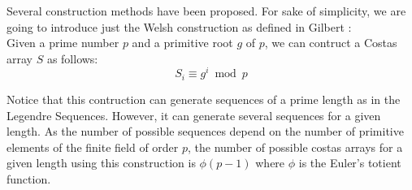 Several construction methods have
been proposed. For sake of simplicity, we are going to introduce just the Welsh
construction as defined in Gilbert \cite{gilbert_costas}:\\

Given a prime number $p$ and a primitive root $g$ of $p$, we can contruct a
Costas array $S$ as follows:
\begin{equation}
  S_{i} \equiv g^{i} \bmod p
\end{equation}

Notice that this contruction can generate sequences of a prime length as in
the Legendre Sequences. However, it can generate several sequences for a given
length. As the number of possible sequences depend on the number of primitive
elements of the finite field of order $p$, the number of possible costas arrays
for a given length using this construction is $\phi(p-1)$ where $\phi$ is the
Euler's totient function.
